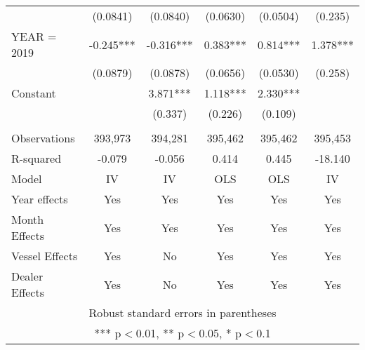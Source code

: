 \begin{tabular}{lccccc}
 & (0.0841) & (0.0840) & (0.0630) & (0.0504) & (0.235) \\
YEAR = 2019 & -0.245*** & -0.316*** & 0.383*** & 0.814*** & 1.378*** \\
 & (0.0879) & (0.0878) & (0.0656) & (0.0530) & (0.258) \\
Constant &  & 3.871*** & 1.118*** & 2.330*** &  \\
 &  & (0.337) & (0.226) & (0.109) &  \\
 &  &  &  &  &  \\
Observations & 393,973 & 394,281 & 395,462 & 395,462 & 395,453 \\
R-squared & -0.079 & -0.056 & 0.414 & 0.445 & -18.140 \\
Model & IV & IV & OLS & OLS & IV \\
Year effects & Yes & Yes & Yes & Yes & Yes \\
Month Effects & Yes & Yes & Yes & Yes & Yes \\
Vessel Effects & Yes & No & Yes & Yes & Yes \\
 Dealer Effects & Yes & No & Yes & Yes & Yes \\ \hline
\multicolumn{6}{c}{ Robust standard errors in parentheses} \\
\multicolumn{6}{c}{ *** p$<$0.01, ** p$<$0.05, * p$<$0.1} \\
\end{tabular}
